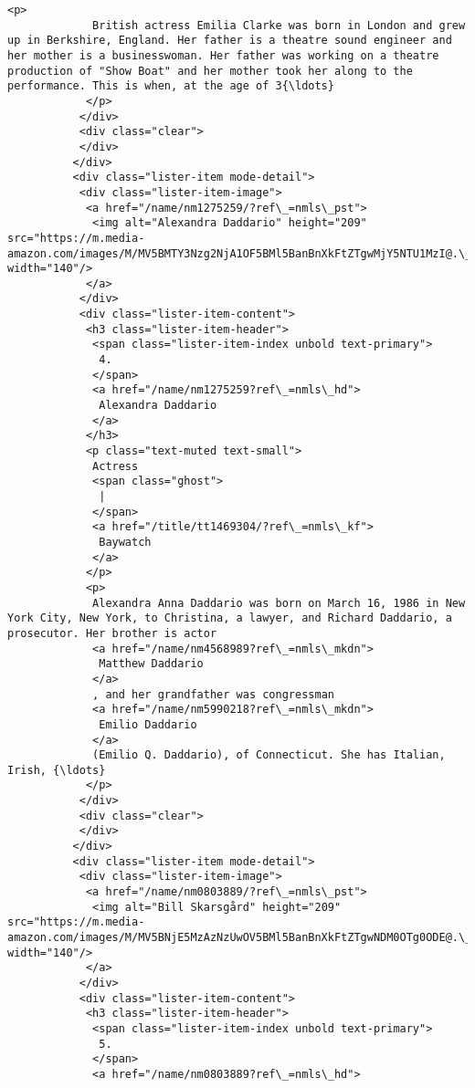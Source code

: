 \documentclass[11pt]{article}
\begin{document}
\begin{Verbatim}[commandchars=\\\{\}]
            <p>
             British actress Emilia Clarke was born in London and grew up in Berkshire, England. Her father is a theatre sound engineer and her mother is a businesswoman. Her father was working on a theatre production of "Show Boat" and her mother took her along to the performance. This is when, at the age of 3{\ldots}
            </p>
           </div>
           <div class="clear">
           </div>
          </div>
          <div class="lister-item mode-detail">
           <div class="lister-item-image">
            <a href="/name/nm1275259/?ref\_=nmls\_pst">
             <img alt="Alexandra Daddario" height="209" src="https://m.media-amazon.com/images/M/MV5BMTY3Nzg2NjA1OF5BMl5BanBnXkFtZTgwMjY5NTU1MzI@.\_V1\_UY209\_CR7,0,140,209\_AL\_.jpg" width="140"/>
            </a>
           </div>
           <div class="lister-item-content">
            <h3 class="lister-item-header">
             <span class="lister-item-index unbold text-primary">
              4.
             </span>
             <a href="/name/nm1275259?ref\_=nmls\_hd">
              Alexandra Daddario
             </a>
            </h3>
            <p class="text-muted text-small">
             Actress
             <span class="ghost">
              |
             </span>
             <a href="/title/tt1469304/?ref\_=nmls\_kf">
              Baywatch
             </a>
            </p>
            <p>
             Alexandra Anna Daddario was born on March 16, 1986 in New York City, New York, to Christina, a lawyer, and Richard Daddario, a prosecutor. Her brother is actor
             <a href="/name/nm4568989?ref\_=nmls\_mkdn">
              Matthew Daddario
             </a>
             , and her grandfather was congressman
             <a href="/name/nm5990218?ref\_=nmls\_mkdn">
              Emilio Daddario
             </a>
             (Emilio Q. Daddario), of Connecticut. She has Italian, Irish, {\ldots}
            </p>
           </div>
           <div class="clear">
           </div>
          </div>
          <div class="lister-item mode-detail">
           <div class="lister-item-image">
            <a href="/name/nm0803889/?ref\_=nmls\_pst">
             <img alt="Bill Skarsgård" height="209" src="https://m.media-amazon.com/images/M/MV5BNjE5MzAzNzUwOV5BMl5BanBnXkFtZTgwNDM0OTg0ODE@.\_V1\_UY209\_CR12,0,140,209\_AL\_.jpg" width="140"/>
            </a>
           </div>
           <div class="lister-item-content">
            <h3 class="lister-item-header">
             <span class="lister-item-index unbold text-primary">
              5.
             </span>
             <a href="/name/nm0803889?ref\_=nmls\_hd">

\end{Verbatim}
\end{document}
